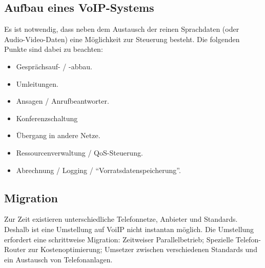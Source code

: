 \documentclass{article} %
\begin{document}
\subsection{Aufbau eines VoIP-Systems}
Es ist notwendig, dass neben dem Austausch der reinen Sprachdaten (oder Audio-Video-Daten) eine Möglichkeit zur Steuerung besteht. Die folgenden Punkte sind dabei zu beachten:
\begin{itemize}
	\item Gesprächsauf- / -abbau.
	\item Umleitungen.
	\item Ansagen / Anrufbeantworter.
	\item Konferenzschaltung
	\item Übergang in andere Netze.
	\item Ressourcenverwaltung / QoS-Steuerung.
	\item Abrechnung / Logging / "`Vorratsdatenspeicherung"'.
\end{itemize}

\subsection{Migration}
Zur Zeit existieren unterschiedliche Telefonnetze, Anbieter und Standards. Deshalb ist eine Umstellung auf VoiIP nicht instantan möglich. Die Umstellung erfordert eine schrittweise Migration: Zeitweiser Parallelbetrieb; Spezielle Telefon-Router zur Kostenoptimierung; Umsetzer zwischen verschiedenen Standards und ein Austausch von Telefonanlagen.
\end{document}
